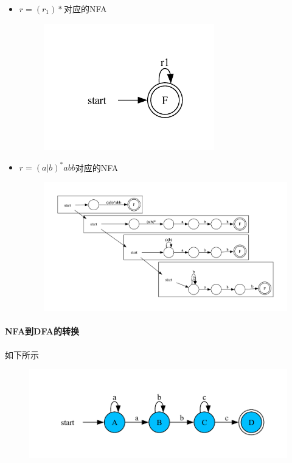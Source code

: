 \documentclass[UTF8]{ctexart} %
\begin{document}
\begin{itemize}
\begin{figure}[H]
          \end{figure}
    \item $r=(r_1)*$对应的NFA
          \begin{figure}[H]
              \centering
              \includegraphics[width=0.7\textwidth]{assets/r1NFA.pdf}
          \end{figure}
    \item $r=(a|b)^*abb$对应的NFA
          \begin{figure}[H]
              \centering
              \includegraphics[width=\textwidth]{assets/ababb.pdf}
          \end{figure}
\end{itemize}

\paragraph{NFA到DFA的转换} 如下所示

\begin{figure}[H]
    \centering
    \includegraphics[width=\textwidth]{assets/nfa2.pdf}
\end{figure}
\end{document}
